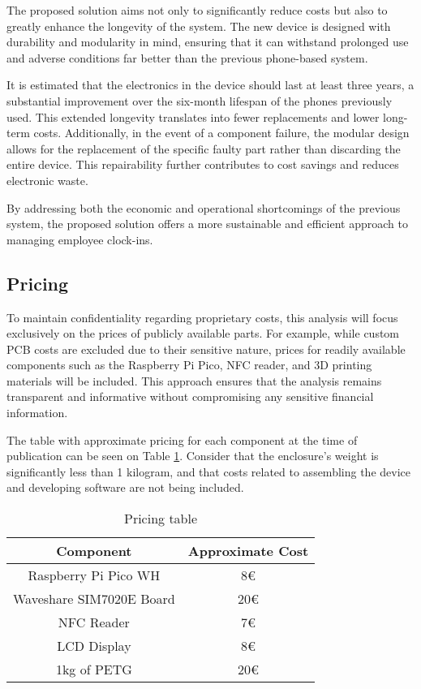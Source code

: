 The proposed solution aims not only to significantly reduce costs but also to greatly enhance the 
longevity of the system. The new device is designed with durability and modularity in mind, 
ensuring that it can withstand prolonged use and adverse conditions far better than the previous 
phone-based system.

It is estimated that the electronics in the device should last at least three years, a substantial 
improvement over the six-month lifespan of the phones previously used. This extended longevity 
translates into fewer replacements and lower long-term costs. Additionally, in the event of a 
component failure, the modular design allows for the replacement of the specific faulty part 
rather than discarding the entire device. This repairability further contributes to cost savings 
and reduces electronic waste.

By addressing both the economic and operational shortcomings of the previous system, the proposed 
solution offers a more sustainable and efficient approach to managing employee clock-ins.

\subsection{Pricing}

To maintain confidentiality regarding proprietary costs, this analysis will focus exclusively on 
the prices of publicly available parts. For example, while custom PCB costs are excluded due to 
their sensitive nature, prices for readily available components such as the Raspberry Pi Pico, NFC 
reader, and 3D printing materials will be included. This approach ensures that the analysis 
remains transparent and informative without compromising any sensitive financial information.

The table with approximate pricing for each component at the time of publication can be seen on 
Table \ref{tab:pricing_table}. Consider that the enclosure's weight is significantly less than 1 
kilogram, and that costs related to assembling the device and developing software are not being 
included.


\begin{table}
	\centering
	\begin{tabular}{c|c}
		\textbf{Component} & \textbf{Approximate Cost} \\
		\hline\hline
		Raspberry Pi Pico WH & 8€\\
		Waveshare SIM7020E Board & 20€\\
		NFC Reader & 7€\\
		LCD Display & 8€\\
		1kg of PETG & 20€\\
		\hline
	\end{tabular}
	\caption{Pricing table}
	\label{tab:pricing_table}
\end{table}
